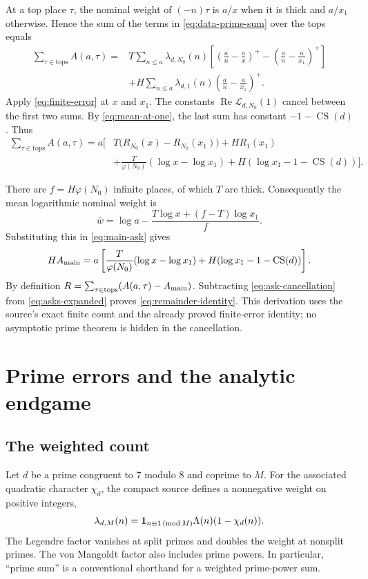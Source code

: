 \documentclass[11pt,oneside,openany]{amsbook}
\theoremstyle{remark}
\numberwithin{equation}{section}
\newcommand{\Lam}{\Lambda}
\newcommand{\re}{\operatorname{Re}}
\begin{document}
At a top place $\tau$, the nominal weight of
$(-n)\tau$ is $a/x$ when it is thick and $a/x_1$
otherwise. Hence the sum of the terms in
\eqref{eq:data-prime-sum} over the tops equals
\begin{align}
\label{eq:asks-sum}
\sum_{\tau\in\mathrm{tops}}A(a,\tau)
={}&T\sum_{n\le a}\lambda_{d,N_0}(n)
  \left[\left(\frac an-\frac ax\right)^+
        -\left(\frac an-\frac a{x_1}\right)^+\right]\\
 &+H\sum_{n\le a}\lambda_{d,1}(n)
       \left(\frac an-\frac a{x_1}\right)^+.
\end{align}
Apply \eqref{eq:finite-error} at $x$ and $x_1$.
The constants $\re\mathcal L_{d,N_0}(1)$ cancel
between the first two sums. By
\eqref{eq:mean-at-one}, the last sum has constant
$-1-\operatorname{CS}(d)$. Thus
\begin{align}
\label{eq:asks-expanded}
\sum_{\tau\in\mathrm{tops}}A(a,\tau)
=a\bigg[&T\bigl(R_{N_0}(x)-R_{N_0}(x_1)\bigr)
       +H R_1(x_1)\\
 &+\frac{T}{\varphi(N_0)}(\log x-\log x_1)
       +H(\log x_1-1-\operatorname{CS}(d))\bigg].
\end{align}

There are $f=H\varphi(N_0)$ infinite places, of which
$T$ are thick. Consequently the mean logarithmic
nominal weight is
\[
\bar w=\log a-
 \frac{T\log x+(f-T)\log x_1}{f}.
\]
Substituting this in \eqref{eq:main-ask} gives
\begin{equation}
\label{eq:ask-cancellation}
H A_{\rm main}=a\left[
 \frac{T}{\varphi(N_0)}(\log x-\log x_1)
 +H(\log x_1-1-\operatorname{CS}(d))\right].
\end{equation}
By definition $R=\sum_{\tau\in\mathrm{tops}}
(A(a,\tau)-A_{\rm main})$. Subtracting
\eqref{eq:ask-cancellation} from
\eqref{eq:asks-expanded} proves
\eqref{eq:remainder-identity}. This derivation uses
the source's exact finite count and the already proved
finite-error identity; no asymptotic prime theorem is
hidden in the cancellation.

\chapter{Prime errors and the analytic endgame}
\label{ch:prime-error}
\section{The weighted count}
\label{sec:error-definition}
Let $d$ be a prime congruent to $7$ modulo $8$ and coprime to $M$.
For the associated quadratic character $\chi_d$, the compact
source defines a nonnegative weight on positive integers,
\begin{equation}
\label{eq:lambda}
\lambda_{d,M}(n)=
  \mathbf1_{n\equiv1\,({\rm mod}\,M)}
  \Lam(n)(1-\chi_d(n)).
\end{equation}
The Legendre factor vanishes at split primes and doubles the weight
at nonsplit primes. The von Mangoldt factor also includes prime
powers. In particular, ``prime sum'' is a conventional shorthand
for a weighted prime-power sum.
\end{document}

